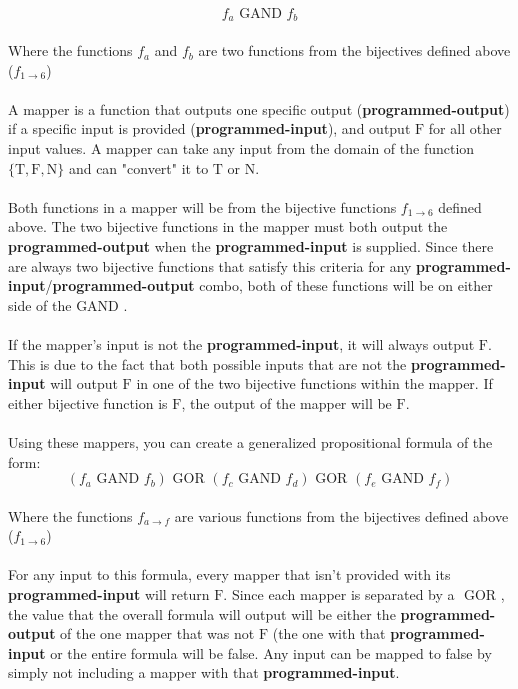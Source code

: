 \documentclass[11pt]{article}
\newcommand{\True}{\mbox{T}}
\newcommand{\False}{\mbox{F}}
\newcommand{\Neither}{\mbox{N}}
\newcommand{\gor}{\mbox{ GOR }}
\newcommand{\gand}{\mbox{ GAND }}
\begin{document}
\begin{enumerate}
\begin{enumerate}
\begin{solution}
$$f_a \gand f_b$$\\
Where the functions $f_a$ and $f_b$ are two functions from the bijectives defined above ($f_{1\rightarrow 6}$)\\\\
A mapper is a function that outputs one specific output (\textbf{programmed-output}) if a specific input is provided (\textbf{programmed-input}), and output $\False$ for all other input values. A mapper can take any input from the domain of the function $\{\True,\False,\Neither\}  $ and can "convert" it to $\True$ or $\Neither$.
\\\\
Both functions in a mapper will be from the bijective functions $f_{1\rightarrow 6}$ defined above. The two bijective functions in the mapper must both output the \textbf{programmed-output} when the \textbf{programmed-input} is supplied. Since there are always two bijective functions that satisfy this criteria for any \textbf{programmed-input}/\textbf{programmed-output} combo, both of these functions will be on either side of the$\gand$.
\\\\
If the mapper's input is not the \textbf{programmed-input}, it will always output $\False$. This is due to the fact that both possible inputs that are not the \textbf{programmed-input} will output $\False$ in one of the two bijective functions within the mapper. If either bijective function is $\False$, the output of the mapper will be $\False$.
\\\\
Using these mappers, you can create a generalized propositional formula of the form:\\
$$(f_a \gand f_b) \gor (f_c \gand f_d) \gor (f_e \gand f_f)$$ \\
Where the functions $f_{a\rightarrow f}$ are various functions from the bijectives defined above ($f_{1\rightarrow 6}$)\\\\
For any input to this formula, every mapper that isn't provided with its \textbf{programmed-input} will return $\False$. Since each mapper is separated by a $\gor$, the value that the overall formula will output will be either the \textbf{programmed-output} of the one mapper that was not $\False$ (the one with that \textbf{programmed-input} or the entire formula will be false. Any input can be mapped to false by simply not including a mapper with that \textbf{programmed-input}.
\\\\

\end{solution}
\end{enumerate}
\end{enumerate}
\end{document}
